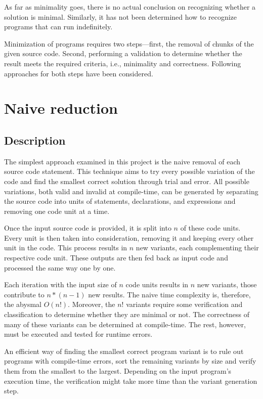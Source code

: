 As far as minimality goes, there is no actual conclusion on recognizing 
whether a solution is minimal.
Similarly, it has not been determined how to recognize programs that can 
run indefinitely.

Minimization of programs requires two steps—first, the removal of chunks 
of the given source code.
Second, performing a validation to determine whether the result meets 
the required criteria, i.e., minimality and correctness.
Following approaches for both steps have been considered.

\section{Naive reduction}

\subsection{Description}

The simplest approach examined in this project is the naive removal of each 
source code statement.
This technique aims to try every possible variation of the code and find 
the smallest correct solution through trial and error.
All possible variations, both valid and invalid at compile-time, can be 
generated by separating the source code into units of statements, 
declarations, and expressions and removing one code unit at a time.

Once the input source code is provided, it is split into $n$ of these 
code units.
Every unit is then taken into consideration, removing it and keeping every 
other unit in the code.
This process results in $n$ new variants, each complementing their 
respective code unit.
These outputs are then fed back as input code and processed the same way 
one by one.



Each iteration with the input size of $n$ code units results in $n$ new 
variants, those contribute to $n * (n - 1) $ new results.
The naive time complexity is, therefore, the abysmal $O(n!)$.
Moreover, the $n!$ variants require some verification and classification 
to determine whether they are minimal or not.
The correctness of many of these variants can be determined at compile-time.
The rest, however, must be executed and tested for runtime errors.

An efficient way of finding the smallest correct program variant is to rule 
out programs with compile-time errors, sort the remaining variants by size 
and verify them from the smallest to the largest.
Depending on the input program's execution time, the verification might take 
more time than the variant generation step.

